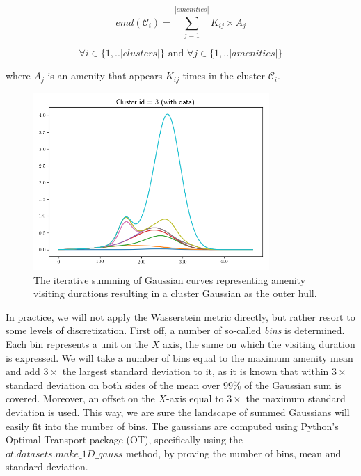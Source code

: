 \documentclass{ws-ijait}
\begin{document}
	\begin{equation}
	emd(\mathcal{C}_i) = \sum_{j=1}^{|amenities|} K_{ij} \times A_j
	\end{equation}
	
	$$\forall i \in \{1,..|clusters|\} \text{ and } \forall j \in \{1,..|amenities|\}$$
	
	where $A_j$ is an amenity that appears $K_{ij}$ times in the cluster $\mathcal{C}_i$.
	
	\begin{figure}[!ht]
		\centering
		\includegraphics[width=0.8\textwidth]{../graphics/emd_gaussian_addition3.png}
		\caption{The iterative summing of Gaussian curves representing amenity visiting durations resulting in a cluster Gaussian as the outer hull.}
		\label{fig:gaussian}
	\end{figure}
	
	In practice, we will not apply the Wasserstein metric directly, but rather resort to some levels of discretization. First off, a number of so-called \textit{bins} is determined. Each bin represents a unit on the $X$ axis, the same on which the visiting duration is expressed. We will take a number of bins equal to the maximum amenity mean and add $3\times$ the largest standard deviation to it, as it is known that within $3\times$ standard deviation on both sides of the mean over 99\% of the Gaussian sum is covered. Moreover, an offset on the $X$-axis equal to $3\times$ the maximum standard deviation is used. This way, we are sure the landscape of summed Gaussians will easily fit into the number of bins. The gaussians are computed using Python's Optimal Transport package (OT), specifically using the $ot.datasets.make\_1D\_gauss$ method, by proving the number of bins, mean and standard deviation.
	
\end{document}
